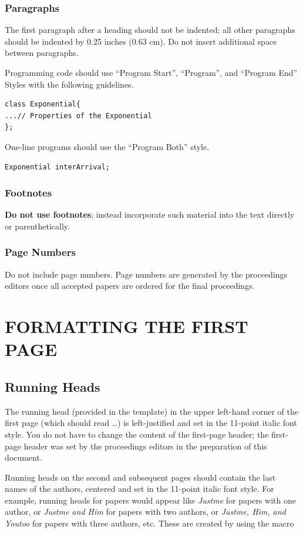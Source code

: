 \documentclass{wscpaperproc}
\theoremstyle{wsc}
\begin{document}
\subsubsection{Paragraphs}
The first paragraph after a heading should not be indented; all other paragraphs should be indented by 0.25 inches (0.63 cm). Do not insert additional space between paragraphs.

Programming code should use ``Program Start'', ``Program'', and ``Program End'' Styles with the following guidelines.

\begin{verbatim}
class Exponential{
...// Properties of the Exponential
};
\end{verbatim}

One-line programs should use the ``Program Both'' style.

\begin{verbatim}
Exponential interArrival;
\end{verbatim}

\subsubsection{Footnotes}
\textbf{Do not use footnotes}; instead incorporate such material into the text directly or parenthetically.

\subsubsection{Page Numbers}
Do not include page numbers. Page numbers are generated by the proceedings editors once all accepted papers are ordered for the final proceedings.

\section{FORMATTING THE FIRST PAGE}

\subsection{Running Heads}
The running head (provided in the template) in the upper left-hand corner of the first page (which should read {\em \currentCaption}\dots) is left-justified and set in the 11-point italic font style. You do not have to change the content of the first-page header; the first-page header was set by the proceedings editors in the preparation of this document.

Running heads on the second and subsequent pages should contain the last names of the authors, centered and set in the 11-point italic font style. For example, running heads for papers would appear like \textit{Justme} for papers with one author, or \textit{Justme and Him} for papers with two authors, or \textit{Justme, Him, and Youtoo} for papers with three authors, etc. These are created by using the macro\newline
\end{document}
